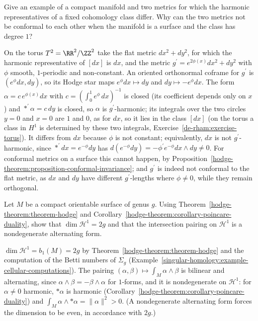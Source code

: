\begin{exercise}\label{hodge-theorem:exercise-harmonic-not-metric-independent}
Give an example of a compact manifold and two metrics for which the harmonic representatives of a fixed cohomology class differ. Why can the two metrics not be conformal to each other when the
manifold is a surface and the class has degree $1$?
\end{exercise}

\begin{solution}
On the torus $T^2 = \RR^2/\ZZ^2$ take the flat metric $dx^2 + dy^2$, for which the harmonic representative of $[dx]$ is $dx$, and the metric $g^{\prime} = e^{2\phi(x)}dx^2 + dy^2$ with $\phi$ smooth,
$1$-periodic and non-constant. An oriented orthonormal coframe for $g^{\prime}$ is $(e^\phi dx, dy)$, so its Hodge star maps $e^\phi dx \mapsto dy$ and $dy \mapsto -e^\phi dx$. The form
$\alpha = c\,e^{\phi(x)}dx$ with $c = (\int_0^1e^\phi\,dx)^{-1}$ is closed (its coefficient depends only on $x$) and $*^{\prime}\alpha = c\,dy$ is closed, so $\alpha$ is $g^{\prime}$-harmonic; its integrals over the
two circles $y = 0$ and $x = 0$ are $1$ and $0$, as for $dx$, so it lies in the class $[dx]$ (on the torus a class in $H^1$ is determined by these two integrals, Exercise~\ref{de-rham:exercise-torus}).
It differs from $dx$ because $\phi$ is not constant; equivalently, $dx$ is not $g^{\prime}$-harmonic, since $*^{\prime}dx = e^{-\phi}dy$ has $d(e^{-\phi}dy) = -\phi^{\prime}e^{-\phi}dx \wedge dy \neq 0$. For conformal metrics on a
surface this cannot happen, by Proposition~\ref{hodge-theorem:proposition-conformal-invariance}; and $g^{\prime}$ is indeed not conformal to the flat metric, as $dx$ and $dy$ have different $g^{\prime}$-lengths where
$\phi \neq 0$, while they remain orthogonal.
\end{solution}

\begin{exercise}\label{hodge-theorem:exercise-hodge-riemann-surface}
Let $M$ be a compact orientable surface of genus $g$. Using Theorem~\ref{hodge-theorem:theorem-hodge} and
Corollary~\ref{hodge-theorem:corollary-poincare-duality}, show that $\dim\mathcal{H}^1 = 2g$ and that the intersection pairing on $\mathcal{H}^1$ is a nondegenerate alternating form.
\end{exercise}

\begin{solution}
$\dim\mathcal{H}^1 = b_1(M) = 2g$ by Theorem~\ref{hodge-theorem:theorem-hodge} and the computation of the Betti numbers of $\Sigma_g$ (Example~\ref{singular-homology:example-cellular-computations}). The pairing
$(\alpha, \beta) \mapsto \int_M\alpha \wedge \beta$ is bilinear and alternating, since $\alpha \wedge \beta = -\beta \wedge \alpha$ for $1$-forms, and it is nondegenerate on $\mathcal{H}^1$: for $\alpha \neq 0$
harmonic, $*\alpha$ is harmonic (Corollary~\ref{hodge-theorem:corollary-poincare-duality}) and $\int_M\alpha \wedge *\alpha = \|\alpha\|^2 > 0$. (A nondegenerate alternating form forces the dimension to be even,
in accordance with $2g$.)
\end{solution}

